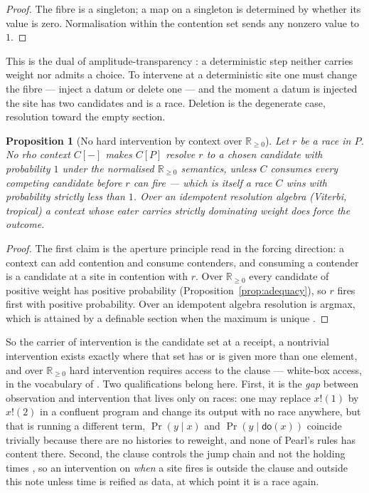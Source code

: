 \documentclass[11pt,a4paper]{article}
\theoremstyle{plain}
\newtheorem{proposition}[theorem]{Proposition}
\theoremstyle{definition}
\theoremstyle{remark}
\newcommand{\rhoc}{\textsf{rho}}
\newcommand{\Rnn}{\mathbb{R}_{\geq 0}}
\newcommand{\dok}{\textsf{do}}
\begin{document}
\begin{proof}
The fibre is a singleton; a map on a singleton is determined by whether its
value is zero. Normalisation within the contention set sends any nonzero value
to $1$.
\end{proof}

This is the dual of amplitude-transparency \cite[Prop.~8.5]{GradedV4}: a
deterministic step neither carries weight nor admits a choice. To intervene at
a deterministic site one must change the fibre --- inject a datum or delete one
--- and the moment a datum is injected the site has two candidates and is a
race. Deletion is the degenerate case, resolution toward the empty section.

\begin{proposition}[No hard intervention by context over $\Rnn$]
\label{prop:nocontext}
Let $r$ be a race in $P$. No \rhoc{} context $C[-]$ makes $C[P]$ resolve $r$
to a chosen candidate with probability $1$ under the normalised $\Rnn$
semantics, unless $C$ consumes every competing candidate before $r$ can fire
--- which is itself a race $C$ wins with probability strictly less than $1$. Over
an idempotent resolution algebra (Viterbi, tropical) a context whose eater
carries strictly dominating weight does force the outcome.
\end{proposition}

\begin{proof}
The first claim is the aperture principle \cite[Prin.~2.1]{GradedV4} read in
the forcing direction: a context can add contention and consume contenders, and
consuming a contender is a candidate at a site in contention with $r$. Over
$\Rnn$ every candidate of positive weight has positive probability
(Proposition~\ref{prop:adequacy}), so $r$ fires first with positive probability.
Over an idempotent algebra resolution is argmax, which is attained by a
definable section when the maximum is unique \cite[Prop.~3.4(i)]{ChoiceFormulae}.
\end{proof}

So the carrier of intervention is the candidate set at a receipt, a nontrivial
intervention exists exactly where that set has or is given more than one
element, and over $\Rnn$ hard intervention requires access to the clause ---
white-box access, in the vocabulary of \cite{ExpRegimes}. Two qualifications
belong here. First, it is the \emph{gap} between observation and intervention
that lives only on races: one may replace $x!(1)$ by $x!(2)$ in a confluent
program and change its output with no race anywhere, but that is running a
different term, $\Pr(y\mid x)$ and $\Pr(y\mid \dok(x))$ coincide trivially
because there are no histories to reweight, and none of Pearl's rules has
content there. Second, the clause controls the jump chain and not the holding
times \cite[Rem.~3.2]{GradedPLN}, so an intervention on \emph{when} a site fires
is outside the clause and outside this note unless time is reified as data, at
which point it is a race again.
\end{document}
